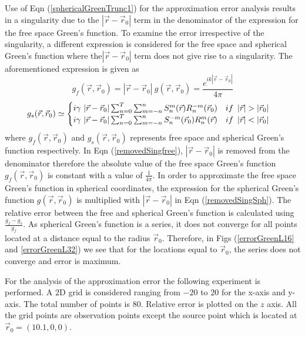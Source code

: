 \par
Use of  Eqn (\ref{sphericalGreenTrunc1}) for the approximation error analysis results in a singularity due to the  $|\vec{r}-\vec{r}_0|$ term  in the denominator of the expression for the free space Green's function. To examine the error irrespective of the singularity, a different expression is considered for the free space and spherical Green's function where  the$ |\vec{r}-\vec{r}_0|$ term does not give rise to a singularity. The aforementioned expression is given as 
\begin{equation}
\label{removedSingfree}
g_f(\vec{r},\vec{r}_0)=|\vec{r}-\vec{r}_0|~g(\vec{r},\vec{r}_0)= \frac{e^{ik|\vec{r}-\vec{r}_0|}}{4\pi}
\end{equation}
\begin{equation}
\label{removedSingSph}
g_{s}(\vec{r},\vec{r}_0)\simeq \begin{cases} i\gamma~|\vec{r}-\vec{r}_0| \sum_{n=0}^{T}\sum_{m=-n}^{n}S_{n}^{m}( \vec{r})R_{n}^{-m}(\vec{r}_0)\enskip \enskip {if }\enskip |\vec{r}|>|\vec{r}_0| \\
i\gamma~|\vec{r}-\vec{r}_0| \sum_{n=0}^{T}\sum_{m=-n}^{n}S_{n}^{-m}( \vec{r}_0)R_{n}^{m}(\vec{r})\enskip \enskip {if }\enskip |\vec{r}|<|\vec{r}_0|
\end{cases}
\end{equation}   
where $g_f(\vec{r},\vec{r}_0)$ and  $g_{s}(\vec{r},\vec{r}_0)$ represents free space and spherical Green's function respectively. In Eqn (\ref{removedSingfree}), $|\vec{r}-\vec{r}_0|$ is removed from the denominator therefore  the absolute value of the free space Green's function  $g_{f}(\vec{r},\vec{r}_0)$ is  constant with a value of  $\frac{1}{4\pi}$. In order to approximate the free space Green's function in spherical coordinates,  the expression for the spherical Green's function $g(\vec{r},\vec{r}_0)$ is multiplied with $|\vec{r}-\vec{r}_0|$ in Eqn (\ref{removedSingSph}). The relative error between the free and spherical Green's function is calculated using $\frac{g_{f}-g_{s}}{g_f}$.  As spherical Green's function is a series, it does not converge for all points  located at  a distance equal to the radius $\vec{r}_0$.  Therefore, in  Figs (\ref{errorGreenL16} and   \ref{errorGreenL32}) we see that for the locations equal to $\vec{r}_0$,  the series does not converge  and error is maximum. 
\par 
For the analysis of the approximation error the following experiment is performed.  A  $2$D  grid is considered  ranging from $-20$ to $20$ for the x-axis and y-axis. The total number of points is $80$. Relative error is plotted on the $z$ axis.  All the grid points are observation points except the source point which is located at $\vec{r}_0=(10.1,0,0)$. 


